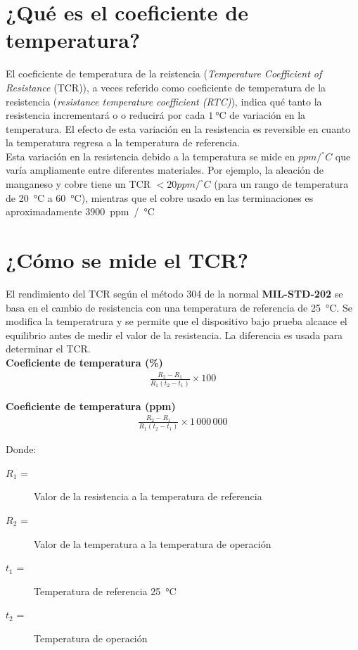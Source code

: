 \documentclass[
10pt, %
a4paper, %
oneside, %
headinclude,footinclude, %
BCOR5mm, %
]{scrartcl}
\begin{document}
\section{¿Qué es el coeficiente de temperatura?}
El coeficiente de temperatura de la reistencia (\textit{Temperature Coefficient of Resistance} (TCR)), a veces referido como coeficiente de temperatura de la resistencia (\textit{resistance temperature coefficient (RTC)}), indica qué tanto la resistencia incrementará o o reducirá por cada $\qty{1}{\degreeCelsius}$ de variación en la temperatura. El efecto de esta variación en la resistencia es reversible en cuanto la temperatura regresa a la temperatura de referencia. \\

Esta variación en la resistencia debido a la temperatura se mide en $ppm/ ^{\circ} C$ que varía ampliamente entre diferentes materiales. Por ejemplo, la aleación de manganeso y cobre tiene un TCR $< 20 ppm/ ^{\circ} C$ (para un rango de temperatura de \qty{20}{\degreeCelsius} a \qty{60}{\degreeCelsius}), mientras que el cobre usado en las terminaciones es aproximadamente \qty{3900}{ppm / \degreeCelsius}

\section{¿Cómo se mide el TCR?}
El rendimiento del TCR según el método 304 de la normal \textbf{MIL-STD-202} se basa en el cambio de resistencia con una temperatura de referencia de \qty{25}{\degreeCelsius}. Se modifica la temperatrura y se permite que el dispositivo bajo prueba alcance el equilibrio antes de medir el valor de la resistencia. La diferencia es usada para determinar el TCR.\\

\textbf{Coeficiente de temperatura (\%)}
\begin{align}
	\frac{R_2 - R_1}{R_1(t_2 - t_1)} \times 100
\end{align}

\textbf{Coeficiente de temperatura (ppm)}
\begin{align}
	\frac{R_2 - R_1}{R_1(t_2 - t_1)} \times 1\,000\,000
\end{align}

Donde:

\begin{description}
	\item[$R_1$ =] Valor de la resistencia a la temperatura de referencia
	\item[$R_2$ = ] Valor de la temperatura a la temperatura de operación
	\item[$t_1$ = ] Temperatura de referencia \qty{25}{\degreeCelsius}
	\item[$t_2$ = ] Temperatura de operación
\end{description}
\end{document}
